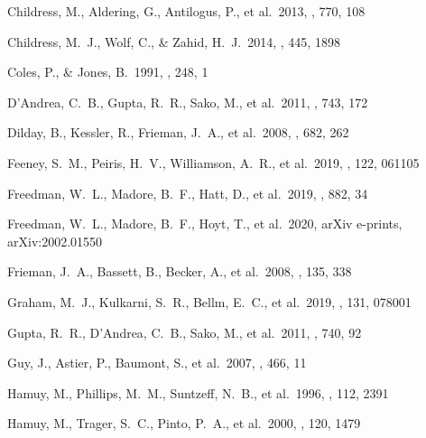\documentclass[]{aa} %
\begin{document}
\begin{thebibliography}{}
 Childress, M., Aldering, G., Antilogus, P., et al.\ 2013, \apj, 770, 108

 Childress, M.~J., Wolf, C., \& Zahid, H.~J.\ 2014, \mnras, 445, 1898


 Coles, P., \& Jones, B.\ 1991, \mnras, 248, 1



 D'Andrea, C.~B., Gupta, R.~R., Sako, M., et al.\ 2011, \apj, 743, 172

 Dilday, B., Kessler, R., Frieman, J.~A., et al.\ 2008, \apj, 682, 262


 Feeney, S.~M., Peiris, H.~V., Williamson, A.~R., et al.\ 2019, \prl, 122, 061105

 Freedman, W.~L., Madore, B.~F., Hatt, D., et al.\ 2019, \apj, 882, 34

 Freedman, W.~L., Madore, B.~F., Hoyt, T., et al.\ 2020, arXiv e-prints, arXiv:2002.01550



 Frieman, J.~A., Bassett, B., Becker, A., et al.\ 2008, \aj, 135, 338


 Graham, M.~J., Kulkarni, S.~R., Bellm, E.~C., et al.\ 2019, \pasp, 131, 078001

 Gupta, R.~R., D'Andrea, C.~B., Sako, M., et al.\ 2011, \apj, 740, 92

 Guy, J., Astier, P., Baumont, S., et al.\ 2007, \aap, 466, 11



 Hamuy, M., Phillips, M.~M., Suntzeff, N.~B., et al.\ 1996, \aj, 112, 2391

 Hamuy, M., Trager, S.~C., Pinto, P.~A., et al.\ 2000, \aj, 120, 1479


\end{thebibliography}
\end{document}

